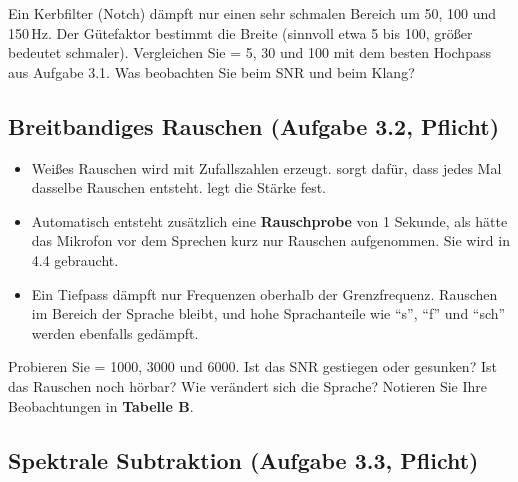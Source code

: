 \documentclass[11pt]{article}
\begin{document}
\begin{block}
Ein Kerbfilter (Notch) dämpft nur einen sehr schmalen Bereich um 50, 100 und 150\,Hz. Der Gütefaktor  bestimmt die Breite (sinnvoll etwa 5 bis 100, größer bedeutet schmaler). Vergleichen Sie  = 5, 30 und 100 mit dem besten Hochpass aus Aufgabe 3.1. Was beobachten Sie beim SNR und beim Klang?
\end{block}

\subsection[Breitbandiges Rauschen]{Breitbandiges Rauschen (Aufgabe 3.2, Pflicht)}


\begin{itemize}
  \item Weißes Rauschen wird mit Zufallszahlen erzeugt.  sorgt dafür, dass jedes Mal dasselbe Rauschen entsteht.  legt die Stärke fest.
  \item Automatisch entsteht zusätzlich eine \textbf{Rauschprobe} von 1 Sekunde, als hätte das Mikrofon vor dem Sprechen kurz nur Rauschen aufgenommen. Sie wird in 4.4 gebraucht.
  \item Ein Tiefpass dämpft nur Frequenzen oberhalb der Grenzfrequenz. Rauschen im Bereich der Sprache bleibt, und hohe Sprachanteile wie "`s"', "`f"' und "`sch"' werden ebenfalls gedämpft.
\end{itemize}

\begin{block}
Probieren Sie  = 1000, 3000 und 6000. Ist das SNR gestiegen oder gesunken? Ist das Rauschen noch hörbar? Wie verändert sich die Sprache? Notieren Sie Ihre Beobachtungen in \textbf{Tabelle B}.
\end{block}

\subsection[Spektrale Subtraktion]{Spektrale Subtraktion (Aufgabe 3.3, Pflicht)}

\end{document}
